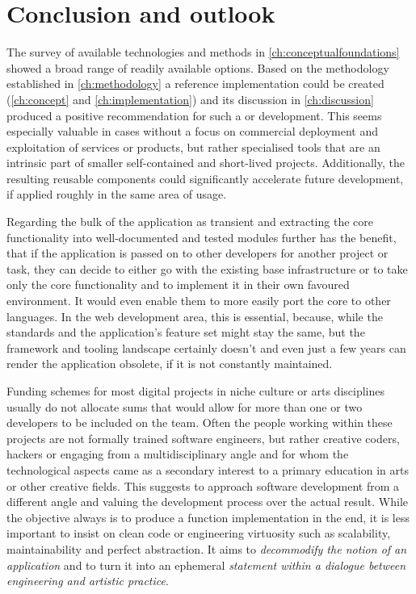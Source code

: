 \chapter{Conclusion and outlook}

The survey of available technologies and methods in \autoref{ch:conceptualfoundations} showed a broad range of readily available options.
Based on the methodology established in \autoref{ch:methodology} a reference implementation could be created (\autoref{ch:concept} and \autoref{ch:implementation}) and its discussion in \autoref{ch:discussion} produced a positive recommendation for such a  or  development.
This seems especially valuable in cases without a focus on commercial deployment and exploitation of services or products, but rather specialised tools that are an intrinsic part of smaller self-contained and short-lived projects.
Additionally, the resulting reusable components could significantly accelerate future development, if applied roughly in the same area of usage.

Regarding the bulk of the application as transient and extracting the core functionality into well-documented and tested modules further has the benefit, that if the application is passed on to other developers for another project or task, they can decide to either go with the existing base infrastructure or to take only the core functionality and to implement it in their own favoured environment.
It would even enable them to more easily port the core to other languages. In the web development area, this is essential, because, while the standards and the application's feature set might stay the same, but the framework and tooling landscape certainly doesn't and even just a few years can render the application obsolete, if it is not constantly maintained.

Funding schemes for most digital projects in niche culture or arts disciplines usually do not allocate sums that would allow for more than one or two developers to be included on the team.
Often the people working within these projects are not formally trained software engineers, but rather creative coders, hackers or engaging from a multidisciplinary angle and for whom the technological aspects came as a secondary interest to a primary education in arts or other creative fields.
This suggests to approach software development from a different angle and valuing the development process over the actual result.
While the objective always is to produce a function implementation in the end, it is less important to insist on clean code or engineering virtuosity such as scalability, maintainability and perfect abstraction.
It aims to \emph{decommodify the notion of an application} and to turn it into an ephemeral \emph{statement within a dialogue between engineering and artistic practice}.

